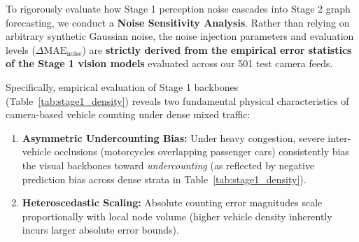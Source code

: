 \documentclass[a4paper,fleqn]{cas-sc}
\begin{document}
To rigorously evaluate how Stage 1 perception noise cascades into Stage 2 graph forecasting, we conduct a \textbf{Noise Sensitivity Analysis}. Rather than relying on arbitrary synthetic Gaussian noise, the noise injection parameters and evaluation levels ($\Delta \text{MAE}_{\text{noise}}$) are \textbf{strictly derived from the empirical error statistics of the Stage 1 vision models} evaluated across our 501 test camera feeds.

Specifically, empirical evaluation of Stage 1 backbones (Table~\ref{tab:stage1_density}) reveals two fundamental physical characteristics of camera-based vehicle counting under dense mixed traffic:
\begin{enumerate}
    \item \textbf{Asymmetric Undercounting Bias:} Under heavy congestion, severe inter-vehicle occlusions (motorcycles overlapping passenger cars) consistently bias the visual backbones toward \emph{undercounting} (as reflected by negative prediction bias across dense strata in Table~\ref{tab:stage1_density}).
    \item \textbf{Heteroscedastic Scaling:} Absolute counting error magnitudes scale proportionally with local node volume (higher vehicle density inherently incurs larger absolute error bounds).
\end{enumerate}
\end{document}
